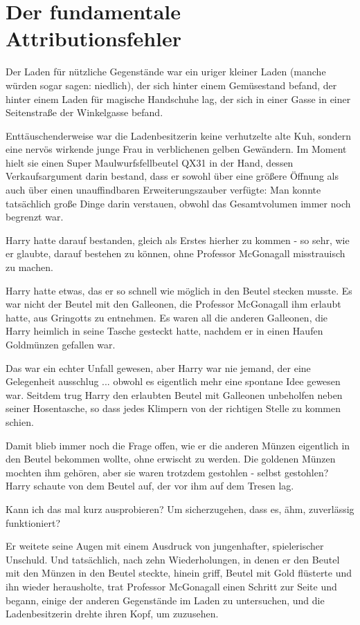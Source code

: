 \chapter{Der fundamentale Attributionsfehler}

Der Laden für nützliche Gegenstände war ein uriger kleiner Laden
(manche würden sogar sagen: niedlich), der sich hinter einem Gemüsestand befand,
der hinter einem Laden für magische Handschuhe lag, der sich in einer Gasse in
einer Seitenstraße der Winkelgasse befand.

Enttäuschenderweise war die Ladenbesitzerin keine verhutzelte alte Kuh, sondern
eine nervös wirkende junge Frau in verblichenen gelben Gewändern. Im Moment
hielt sie einen Super Maulwurfsfellbeutel QX31 in der Hand, dessen
Verkaufsargument darin bestand, dass er sowohl über eine größere Öffnung als
auch über einen unauffindbaren Erweiterungszauber verfügte: Man konnte
tatsächlich große Dinge darin verstauen, obwohl das Gesamtvolumen immer noch
begrenzt war.

Harry hatte darauf bestanden, gleich als Erstes hierher zu kommen - so sehr, wie
er glaubte, darauf bestehen zu können, ohne Professor McGonagall misstrauisch zu
machen.

Harry hatte etwas, das er so schnell wie möglich in den Beutel stecken musste.
Es war nicht der Beutel mit den Galleonen, die Professor McGonagall ihm erlaubt
hatte, aus Gringotts zu entnehmen. Es waren all die anderen Galleonen, die Harry
heimlich in seine Tasche gesteckt hatte, nachdem er in einen Haufen Goldmünzen
gefallen war.

Das war ein echter Unfall gewesen, aber Harry war nie jemand, der eine
Gelegenheit ausschlug ... obwohl es eigentlich mehr eine spontane Idee gewesen
war. Seitdem trug Harry den erlaubten Beutel mit Galleonen unbeholfen neben
seiner Hosentasche, so dass jedes Klimpern von der richtigen Stelle zu kommen
schien.

Damit blieb immer noch die Frage offen, wie er die anderen Münzen eigentlich in
den Beutel bekommen wollte, ohne erwischt zu werden. Die goldenen Münzen mochten
ihm gehören, aber sie waren trotzdem gestohlen - selbst gestohlen? Harry schaute
von dem Beutel auf, der vor ihm auf dem Tresen lag.

\glqq{}Kann ich das mal kurz ausprobieren? Um sicherzugehen, dass es, ähm,
zuverlässig funktioniert?\grqq{}

Er weitete seine Augen mit einem Ausdruck von jungenhafter, spielerischer
Unschuld. Und tatsächlich, nach zehn Wiederholungen, in denen er den Beutel mit
den Münzen in den Beutel steckte, hinein griff, \glqq{}Beutel mit Gold\grqq{}
flüsterte und ihn wieder herausholte, trat Professor McGonagall einen Schritt
zur Seite und begann, einige der anderen Gegenstände im Laden zu untersuchen,
und die Ladenbesitzerin drehte ihren Kopf, um zuzusehen.

